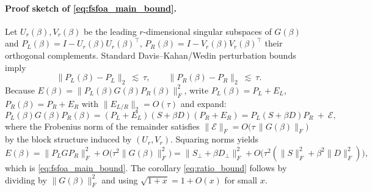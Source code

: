 \paragraph{Proof sketch of \eqref{eq:fsfoa_main_bound}.}
Let $U_r(\beta),V_r(\beta)$ be the leading $r$-dimensional singular subspaces of $G(\beta)$ and $P_L(\beta)=I-U_r(\beta)U_r(\beta)^\top$, $P_R(\beta)=I-V_r(\beta)V_r(\beta)^\top$ their orthogonal complements. Standard Davis--Kahan/Wedin perturbation bounds imply
\begin{equation}\label{eq:proj_bounds}
\|P_L(\beta)-P_L\|_2\ \lesssim\ \tau,\qquad \|P_R(\beta)-P_R\|_2\ \lesssim\ \tau.
\end{equation}
Because $E(\beta)=\|P_L(\beta)G(\beta)P_R(\beta)\|_F^2$, write $P_L(\beta)=P_L+E_L$, $P_R(\beta)=P_R+E_R$ with $\|E_{L/R}\|_2=O(\tau)$ and expand:
\[
P_L(\beta)G(\beta)P_R(\beta)
=(P_L+E_L)(S+\beta D)(P_R+E_R)
= P_L(S+\beta D)P_R\ +\ \mathcal{E},
\]
where the Frobenius norm of the remainder satisfies $\|\mathcal{E}\|_F=O\!\big(\tau\,\|G(\beta)\|_F\big)$ by the block structure induced by $(U_r,V_r)$. Squaring norms yields
\[
E(\beta)=\|P_LGP_R\|_F^2 + O\!\big(\tau^2\|G(\beta)\|_F^2\big)
=\|S_\perp+\beta D_\perp\|_F^2 + O\!\big(\tau^2(\|S\|_F^2+\beta^2\|D\|_F^2)\big),
\]
which is \eqref{eq:fsfoa_main_bound}. The corollary \eqref{eq:ratio_bound} follows by dividing by $\|G(\beta)\|_F^2$ and using $\sqrt{1+x}=1+O(x)$ for small $x$.


